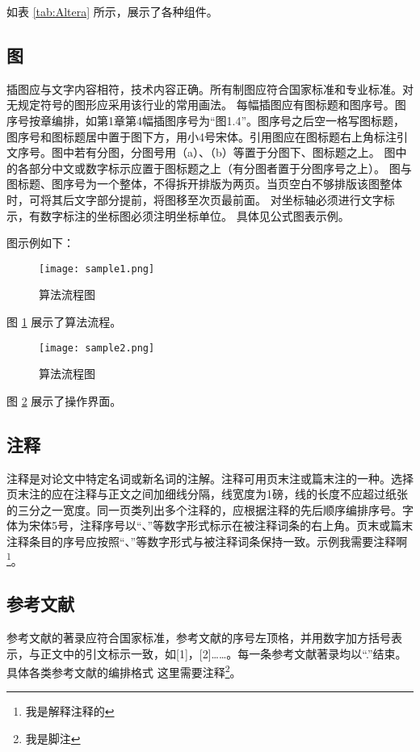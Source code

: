 \documentclass[a4paper,fancyhdr,fntef,UTF8,hyperref,openany,oneside,notitlepage]{book}%
\begin{document}
如表 \ref{tab:Altera} 所示，展示了各种组件。

\subsection{图}
插图应与文字内容相符，技术内容正确。所有制图应符合国家标准和专业标准。对无规定符号的图形应采用该行业的常用画法。
每幅插图应有图标题和图序号。图序号按章编排，如第1章第4幅插图序号为“图1.4”。图序号之后空一格写图标题，图序号和图标题居中置于图下方，用小4号宋体。引用图应在图标题右上角标注引文序号。图中若有分图，分图号用（a）、（b）等置于分图下、图标题之上。
图中的各部分中文或数字标示应置于图标题之上（有分图者置于分图序号之上）。
图与图标题、图序号为一个整体，不得拆开排版为两页。当页空白不够排版该图整体时，可将其后文字部分提前，将图移至次页最前面。
对坐标轴必须进行文字标示，有数字标注的坐标图必须注明坐标单位。
具体见公式图表示例。

图示例如下：
\begin{figure}[!ht]
  \centering
  \texttt{[image: sample1.png]}\\
  \caption{算法流程图}\label{fig:algo}
\end{figure}

图 \ref{fig:algo} 展示了算法流程。

\begin{figure}[!ht]
  \centering
  \texttt{[image: sample2.png]}\\
  \caption{算法流程图}\label{fig:ui}
\end{figure}

图 \ref{fig:ui} 展示了操作界面。

\subsection{注释}
注释是对论文中特定名词或新名词的注解。注释可用页末注或篇末注的一种。选择页末注的应在注释与正文之间加细线分隔，线宽度为1磅，线的长度不应超过纸张的三分之一宽度。同一页类列出多个注释的，应根据注释的先后顺序编排序号。字体为宋体5号，注释序号以“、”等数字形式标示在被注释词条的右上角。页末或篇末注释条目的序号应按照“、”等数字形式与被注释词条保持一致。示例我需要注释啊\footnote{我是解释注释的}。



\subsection{参考文献}
参考文献的著录应符合国家标准，参考文献的序号左顶格，并用数字加方括号表示，与正文中的引文标示一致，如[1]，[2]……。每一条参考文献著录均以“.”结束。具体各类参考文献的编排格式
这里需要注释\footnote{我是脚注}。
\end{document}
